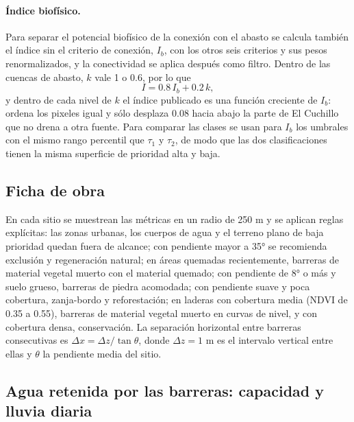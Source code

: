 \paragraph{Índice biofísico.} Para separar el potencial biofísico de la conexión con el abasto se calcula también el índice sin el criterio de conexión, $I_b$, con los otros seis criterios y sus pesos renormalizados, y la conectividad se aplica después como filtro. Dentro de las cuencas de abasto, $k$ vale 1 o 0.6, por lo que
\begin{equation}
I = 0.8\,I_b + 0.2\,k ,
\end{equation}
y dentro de cada nivel de $k$ el índice publicado es una función creciente de $I_b$: ordena los pixeles igual y sólo desplaza 0.08 hacia abajo la parte de El Cuchillo que no drena a otra fuente. Para comparar las clases se usan para $I_b$ los umbrales con el mismo rango percentil que $\tau_1$ y $\tau_2$, de modo que las dos clasificaciones tienen la misma superficie de prioridad alta y baja.

\subsection{Ficha de obra}

En cada sitio se muestrean las métricas en un radio de 250 m y se aplican reglas explícitas: las zonas urbanas, los cuerpos de agua y el terreno plano de baja prioridad quedan fuera de alcance; con pendiente mayor a 35° se recomienda exclusión y regeneración natural; en áreas quemadas recientemente, barreras de material vegetal muerto con el material quemado; con pendiente de 8° o más y suelo grueso, barreras de piedra acomodada; con pendiente suave y poca cobertura, zanja-bordo y reforestación; en laderas con cobertura media (NDVI de 0.35 a 0.55), barreras de material vegetal muerto en curvas de nivel, y con cobertura densa, conservación. La separación horizontal entre barreras consecutivas es $\Delta x = \Delta z/\tan\theta$, donde $\Delta z = 1$ m es el intervalo vertical entre ellas y $\theta$ la pendiente media del sitio.

\subsection{Agua retenida por las barreras: capacidad y lluvia diaria}\label{sec:retencion}

